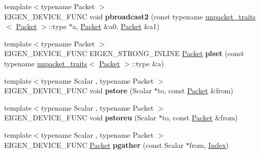 \begin{DoxyCompactItemize}
\item 
\mbox{\label{namespace_eigen_1_1internal_ac327f9e9ef3df2268772137b04f04911}} 
{\footnotesize template$<$typename Packet $>$ }\\E\+I\+G\+E\+N\+\_\+\+D\+E\+V\+I\+C\+E\+\_\+\+F\+U\+NC void {\bfseries pbroadcast2} (const typename \hyperlink{struct_eigen_1_1internal_1_1unpacket__traits}{unpacket\+\_\+traits}$<$ \hyperlink{union_eigen_1_1internal_1_1_packet}{Packet} $>$\+::type $\ast$a, \hyperlink{union_eigen_1_1internal_1_1_packet}{Packet} \&a0, \hyperlink{union_eigen_1_1internal_1_1_packet}{Packet} \&a1)
\item 
\mbox{\label{namespace_eigen_1_1internal_ad78f8a62ca3644d452efbd735a99541c}} 
{\footnotesize template$<$typename Packet $>$ }\\E\+I\+G\+E\+N\+\_\+\+D\+E\+V\+I\+C\+E\+\_\+\+F\+U\+NC E\+I\+G\+E\+N\+\_\+\+S\+T\+R\+O\+N\+G\+\_\+\+I\+N\+L\+I\+NE \hyperlink{union_eigen_1_1internal_1_1_packet}{Packet} {\bfseries plset} (const typename \hyperlink{struct_eigen_1_1internal_1_1unpacket__traits}{unpacket\+\_\+traits}$<$ \hyperlink{union_eigen_1_1internal_1_1_packet}{Packet} $>$\+::type \&a)
\item 
\mbox{\label{namespace_eigen_1_1internal_aaab57ef8d873301545ff0afbf2e28458}} 
{\footnotesize template$<$typename Scalar , typename Packet $>$ }\\E\+I\+G\+E\+N\+\_\+\+D\+E\+V\+I\+C\+E\+\_\+\+F\+U\+NC void {\bfseries pstore} (Scalar $\ast$to, const \hyperlink{union_eigen_1_1internal_1_1_packet}{Packet} \&from)
\item 
\mbox{\label{namespace_eigen_1_1internal_abcb1c5d429335ed8c976a6b238287a2e}} 
{\footnotesize template$<$typename Scalar , typename Packet $>$ }\\E\+I\+G\+E\+N\+\_\+\+D\+E\+V\+I\+C\+E\+\_\+\+F\+U\+NC void {\bfseries pstoreu} (Scalar $\ast$to, const \hyperlink{union_eigen_1_1internal_1_1_packet}{Packet} \&from)
\item 
\mbox{\label{namespace_eigen_1_1internal_a49ef1e59fe39c143bd5a24f8f9d2dcbd}} 
{\footnotesize template$<$typename Scalar , typename Packet $>$ }\\E\+I\+G\+E\+N\+\_\+\+D\+E\+V\+I\+C\+E\+\_\+\+F\+U\+NC \hyperlink{union_eigen_1_1internal_1_1_packet}{Packet} {\bfseries pgather} (const Scalar $\ast$from, \hyperlink{namespace_eigen_a62e77e0933482dafde8fe197d9a2cfde}{Index})

\end{DoxyCompactItemize}
